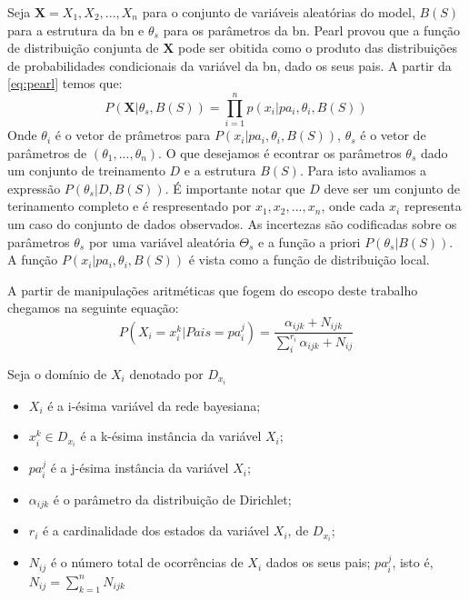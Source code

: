 Seja $\textbf{X} = {X_1,X_2,...,X_n}$ para o conjunto de variáveis aleatórias do model, $B(S)$ para a estrutura da \gls{bn} e $\theta_s$ para os parâmetros da \gls{bn}. Pearl \cite{pearl88} provou que a função de distribuição conjunta de $\textbf{X}$ pode ser obitida como o produto das distribuições de probabilidades condicionais da variável da \gls{bn}, dado os seus pais. A partir da \autoref{eq:pearl} temos que:
\begin{equation}
	P(\textbf{X}|\theta_s, B(S)) = \prod_{i=1}^{n}p(x_i|pa_i,\theta_i,B(S))
\end{equation}
Onde $\theta_i$ é o vetor de prâmetros para $P(x_i|pa_i, \theta_i, B(S))$, $\theta_s$ é o vetor de parâmetros de $(\theta_1,...,\theta_n)$. O que desejamos é econtrar os parâmetros $\theta_s$ dado um conjunto de treinamento $D$ e a estrutura $B(S)$. Para isto avaliamos a expressão $P(\theta_s| D,B(S))$. É importante notar que $D$ deve ser um conjunto de terinamento completo e é respresentado por ${x_1,x_2,...,x_n}$, onde cada $x_i$ representa um caso do conjunto de dados observados. As incertezas são codificadas sobre os parâmetros $\theta_s$ por uma variável aleatória $\Theta_s$ e a função a priori $P(\theta_s|B(S))$. A função $P(x_i|pa_i,\theta_i,B(S))$ é vista como a função de distribuição local.

A partir de manipulações aritméticas que fogem do escopo deste trabalho chegamos na seguinte equação:
\begin{equation}
P(X_i=x_i^k|Pais = pa_i^j) = \frac{\alpha_{ijk}+N_{ijk}}{\sum_{i}^{r_i}\alpha_{ijk}+N_{ij}}
\label{eq:param_learn}
\end{equation}

Seja o domínio de $X_i$ denotado por $D_{x_i}$
\begin{itemize}
	\item $X_i$ é a i-ésima variável da rede bayesiana;
	\item $x_i^k \in D_{x_i}$ é a k-ésima instância da variável $X_i$;
	\item $pa_i^j$ é a j-ésima instância da variável $X_i$;
	\item $\alpha_{ijk}$ é o parâmetro da distribuição de Dirichlet;
	\item $r_i$ é a cardinalidade dos estados da variável $X_i$, de $D_{x_i}$;
	\item $N_{ij}$ é o número total de ocorrências de $X_i$ dados os seus pais; $pa_i^j$, isto é, $N_{ij}=\sum_{k=1}^{n}N_{ijk}$
\end{itemize}

